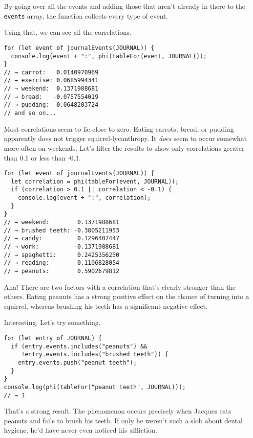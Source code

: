 By going over all the events and adding those that aren't already in there to the \lstinline`events` array, the function collects every type of event.

Using that, we can see all the correlations.

\begin{lstlisting}
for (let event of journalEvents(JOURNAL)) {
  console.log(event + ":", phi(tableFor(event, JOURNAL)));
}
// → carrot:   0.0140970969
// → exercise: 0.0685994341
// → weekend:  0.1371988681
// → bread:   -0.0757554019
// → pudding: -0.0648203724
// and so on...
\end{lstlisting}
\noindent

Most correlations seem to lie close to zero. Eating carrots, bread, or pudding apparently does not trigger squirrel-lycanthropy. It \emph{does} seem to occur somewhat more often on weekends. Let's filter the results to show only correlations greater than 0.1 or less than -0.1.

\begin{lstlisting}
for (let event of journalEvents(JOURNAL)) {
  let correlation = phi(tableFor(event, JOURNAL));
  if (correlation > 0.1 || correlation < -0.1) {
    console.log(event + ":", correlation);
  }
}
// → weekend:        0.1371988681
// → brushed teeth: -0.3805211953
// → candy:          0.1296407447
// → work:          -0.1371988681
// → spaghetti:      0.2425356250
// → reading:        0.1106828054
// → peanuts:        0.5902679812
\end{lstlisting}
\noindent

Aha! There are two factors with a correlation that's clearly stronger than the others. Eating peanuts has a strong positive effect on the chance of turning into a squirrel, whereas brushing his teeth has a significant negative effect.

Interesting. Let's try something.

\begin{lstlisting}
for (let entry of JOURNAL) {
  if (entry.events.includes("peanuts") &&
     !entry.events.includes("brushed teeth")) {
    entry.events.push("peanut teeth");
  }
}
console.log(phi(tableFor("peanut teeth", JOURNAL)));
// → 1
\end{lstlisting}
\noindent

That's a strong result. The phenomenon occurs precisely when Jacques eats peanuts and fails to brush his teeth. If only he weren't such a slob about dental hygiene, he'd have never even noticed his affliction.

